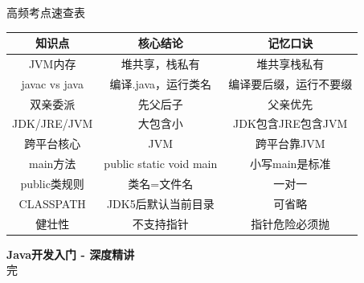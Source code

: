 \documentclass[12pt, a4paper]{ctexart}
\begin{document}
\begin{greenbox}{高频考点速查表}
	\begin{tabular}{|c|c|c|}
		\hline
		\textbf{知识点}  & \textbf{核心结论}           & \textbf{记忆口诀} \\
		\hline
		JVM内存         & 堆共享，栈私有                 & 堆共享栈私有        \\
		\hline
		javac vs java & 编译.java，运行类名            & 编译要后缀，运行不要缀   \\
		\hline
		双亲委派          & 先父后子                    & 父亲优先          \\
		\hline
		JDK/JRE/JVM   & 大包含小                    & JDK包含JRE包含JVM \\
		\hline
		跨平台核心         & JVM                     & 跨平台靠JVM       \\
		\hline
		main方法        & public static void main & 小写main是标准     \\
		\hline
		public类规则     & 类名=文件名                  & 一对一           \\
		\hline
		CLASSPATH     & JDK5后默认当前目录             & 可省略           \\
		\hline
		健壮性           & 不支持指针                   & 指针危险必须抛       \\
		\hline
	\end{tabular}
\end{greenbox}

\newpage

\begin{center}
	\vspace*{2cm}
	\Large\textbf{Java开发入门 - 深度精讲}\\[0.5cm]
	\large{完}
\end{center}
\end{document}

